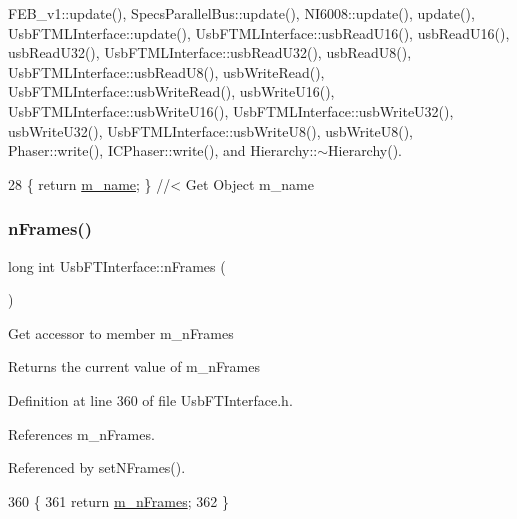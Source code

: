 F\+E\+B\+\_\+v1\+::update(), Specs\+Parallel\+Bus\+::update(), N\+I6008\+::update(), update(), Usb\+F\+T\+M\+L\+Interface\+::update(), Usb\+F\+T\+M\+L\+Interface\+::usb\+Read\+U16(), usb\+Read\+U16(), usb\+Read\+U32(), Usb\+F\+T\+M\+L\+Interface\+::usb\+Read\+U32(), usb\+Read\+U8(), Usb\+F\+T\+M\+L\+Interface\+::usb\+Read\+U8(), usb\+Write\+Read(), Usb\+F\+T\+M\+L\+Interface\+::usb\+Write\+Read(), usb\+Write\+U16(), Usb\+F\+T\+M\+L\+Interface\+::usb\+Write\+U16(), Usb\+F\+T\+M\+L\+Interface\+::usb\+Write\+U32(), usb\+Write\+U32(), Usb\+F\+T\+M\+L\+Interface\+::usb\+Write\+U8(), usb\+Write\+U8(), Phaser\+::write(), I\+C\+Phaser\+::write(), and Hierarchy\+::$\sim$\+Hierarchy().


\begin{DoxyCode}
28 \{ \textcolor{keywordflow}{return} \hyperlink{classObject_a8b83c95c705d2c3ba0d081fe1710f48d}{m\_name}; \} \textcolor{comment}{//< Get Object m\_name}
\end{DoxyCode}
\mbox{\label{classUsbFTInterface_a694f5cb1d38d4369a597ad6761762c0e}} 
\subsubsection{\texorpdfstring{n\+Frames()}{nFrames()}}
{\footnotesize\ttfamily long int Usb\+F\+T\+Interface\+::n\+Frames (\begin{DoxyParamCaption}{ }\end{DoxyParamCaption})\hspace{0.3cm}{\ttfamily [inline]}}

Get accessor to member m\+\_\+n\+Frames \begin{DoxyReturn}{Returns}
the current value of m\+\_\+n\+Frames 
\end{DoxyReturn}


Definition at line 360 of file Usb\+F\+T\+Interface.\+h.



References m\+\_\+n\+Frames.



Referenced by set\+N\+Frames().


\begin{DoxyCode}
360                       \{
361     \textcolor{keywordflow}{return} \hyperlink{classUsbFTInterface_a40770504afc4173034c8a8d6c5f5962c}{m\_nFrames};
362   \}
\end{DoxyCode}
\mbox{\label{classHierarchy_ab16e84de65fd84e14001a6cf941c8be4}} 
